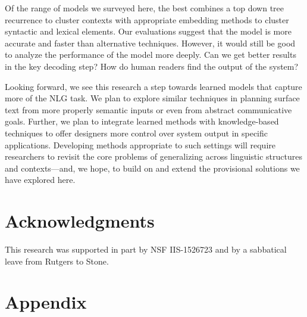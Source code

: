 \documentclass[11pt]{article}
\begin{document}
Of the range of models we surveyed here, the best combines a top down
tree recurrence to cluster contexts with appropriate embedding methods
to cluster syntactic and lexical elements.
%
Our evaluations suggest that the model is more accurate and faster
than alternative techniques. 
%
However, it would still be good to analyze the performance of the
model more deeply.
%
Can we get better results in the key decoding step?  How do human
readers find the output of the system?

Looking forward, we see this research a step towards learned
models that capture more of the NLG task.
%
We plan to explore similar techniques in planning surface text from
more properly semantic inputs or even from abstract communicative
goals.
%
Further, we plan to integrate learned methods with knowledge-based
techniques to offer designers more control over system output in
specific applications.
%
Developing methods appropriate to such settings will require
researchers to revisit the core problems of generalizing
across linguistic structures and contexts---and, we hope, to build on
and extend the provisional solutions we have explored here.

\section*{Acknowledgments}

This research was supported in part by NSF IIS-1526723 and by a
sabbatical leave from Rutgers to Stone.





\newpage
\appendix

\section{Appendix}
\label{sec:appendix}
\end{document}
